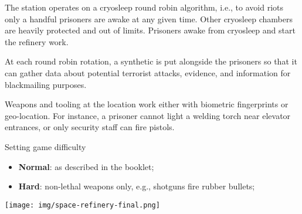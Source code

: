 The station operates on a cryosleep round robin algorithm, i.e., to avoid riots only a handful prisoners are awake at any given time. Other cryosleep chambers are heavily protected and out of limits. Prisoners awake from cryosleep and start the refinery work. 

At each round robin rotation, a synthetic is put alongside the prisoners so that it can gather data about potential terrorist attacks, evidence, and information for blackmailing purposes. 


Weapons and tooling at the location work either with biometric fingerprints or geo-location. For instance, a prisoner cannot light a welding torch near elevator entrances, or only security staff can fire pistols.





\medskip
\begin{rpg-commentbox}{Setting game difficulty}
\begin{itemize}
    \item \textbf{Normal}: as described in the booklet;
    \item \textbf{Hard}: non-lethal weapons only, e.g., shotguns fire rubber bullets;
\end{itemize}
\end{rpg-commentbox}

\newsect

\newpage

\begin{sidewaysfigure*}
    \centering
    \texttt{[image: img/space-refinery-final.png]}
    \label{fig:refinery}
\end{sidewaysfigure*}

\newpage